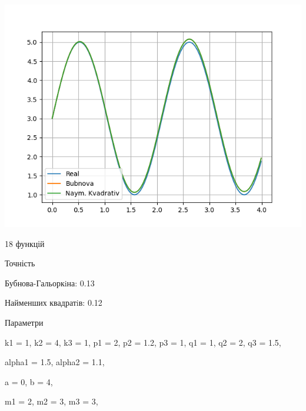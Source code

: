 \begin{minipage}{0.5\textwidth}
    \includegraphics[scale=0.5]{18.png}
\end{minipage}%
\begin{minipage}{0.5\textwidth}
18 функцій


Точність


Бубнова-Гальоркiна:  0.13


Найменших квадратiв: 0.12

\end{minipage}%

Параметри


k1 = 1,
k2 = 4,
k3 = 1,
p1 = 2,
p2 = 1.2,
p3 = 1,
q1 = 1,
q2 = 2,
q3 = 1.5,

alpha1 = 1.5,
alpha2 = 1.1,

a = 0,
b = 4,

m1 = 2,
m2 = 3,
m3 = 3,

